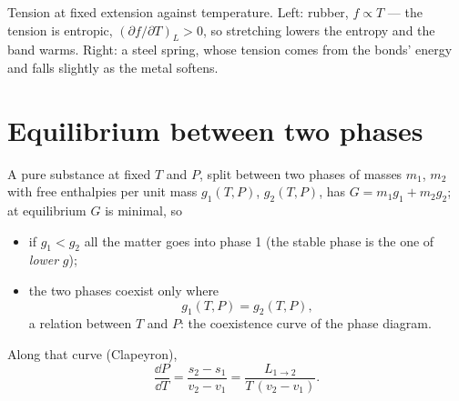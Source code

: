 \begin{omfigure}

{\small Tension at fixed extension against temperature. Left: rubber,
$f \propto T$ --- the tension is entropic, $(\partial f/\partial T)_L > 0$,
so stretching lowers the entropy and the band warms. Right: a steel
spring, whose tension comes from the bonds' energy and falls slightly
as the metal softens.}
\end{omfigure}

\section{Equilibrium between two phases}

\begin{theorem}\label{thm:b2:thermodynamic-potentials:coexistence}
A pure substance at fixed $T$ and $P$, split between two phases of
masses $m_1$, $m_2$ with free enthalpies per unit mass $g_1(T,P)$,
$g_2(T,P)$, has $G = m_1g_1 + m_2g_2$; at equilibrium $G$ is minimal, so
\begin{itemize}
\item if $g_1 < g_2$ all the matter goes into phase 1 (the stable
      phase is the one of \emph{lower} $g$);
\item the two phases coexist only where
      \[
      g_1(T,P) = g_2(T,P) ,
      \]
      a relation between $T$ and $P$: the coexistence curve of the phase
      diagram.
\end{itemize}
Along that curve (Clapeyron),
\[
\frac{\dd P}{\dd T} = \frac{s_2 - s_1}{v_2 - v_1} = \frac{L_{1\to2}}{T\,(v_2 - v_1)} .
\]
\end{theorem}

